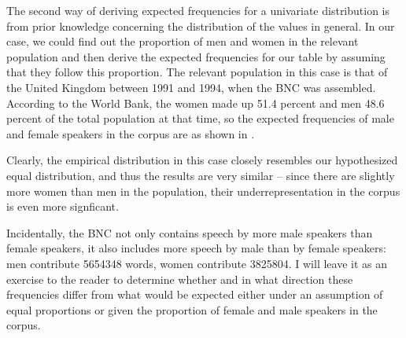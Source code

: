 The second way of deriving expected  frequencies for a univariate distribution  is from prior knowledge concerning the distribution of the values in general. In our case, we could find out the proportion of men and women in the relevant population and then derive the expected frequencies for our table by assuming that they follow this proportion. The relevant population in this case is that of the United Kingdom between 1991 and 1994, when the BNC  was assembled. According to the World Bank, the women made up 51.4 percent and men 48.6 percent of the total population at that time, so the expected  frequencies of male and female speakers in the corpus are as shown in .

\begin{table}
\caption{Observed and expected frequencies of Speaker Sex in the BNC (based on the proportions in the general population)}
\label{tab:speakersexobsexpemp}
\end{table}

Clearly, the empirical distribution  in this case closely resembles our hypothesized equal distribution, and thus the results are very similar -- since there are slightly more women than men in the population, their underrepresentation  in the corpus is even more signficant.

Incidentally, the BNC  not only contains speech by more male speakers than female speakers, it also includes more speech by male than by female speakers: men contribute \num{5654348} words, women contribute \num{3825804}. I will leave it as an exercise to the reader to determine whether and in what direction these frequencies differ from what would be expected  either under an assumption of equal proportions or given the proportion of female and male speakers in the corpus.

